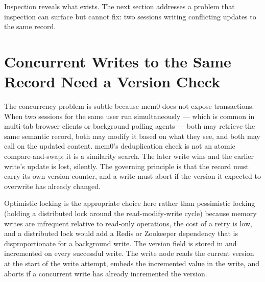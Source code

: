 Inspection reveals what exists. The next section addresses a problem that
inspection can surface but cannot fix: two sessions writing conflicting updates
to the same record.

\section{Concurrent Writes to the Same Record Need a Version Check}
\label{sec:optimistic-locking}

The concurrency problem is subtle because mem0 does not expose transactions.
When two sessions for the same user run simultaneously --- which is common in
multi-tab browser clients or background polling agents --- both may retrieve the
same semantic record, both may modify it based on what they see, and both may
call  on the updated content. mem0's deduplication check is not
an atomic compare-and-swap; it is a similarity search. The later write wins
and the earlier write's update is lost, silently. The governing principle is
that the record must carry its own version counter, and a write must abort if
the version it expected to overwrite has already changed.

Optimistic locking is the appropriate choice here rather than pessimistic
locking (holding a distributed lock around the read-modify-write cycle)
because memory writes are infrequent relative to read-only operations, the
cost of a retry is low, and a distributed lock would add a Redis or Zookeeper
dependency that is disproportionate for a background write. The version field
is stored in  and incremented on every successful
write. The write node reads the current version at the start of the write
attempt, embeds the incremented value in the write, and aborts if a
concurrent write has already incremented the version.

